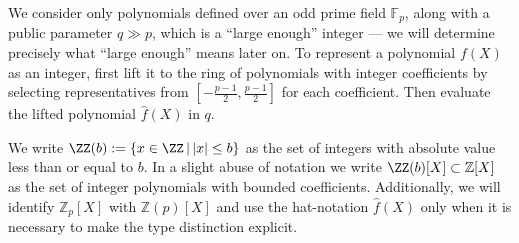 We consider only polynomials defined over an odd prime field $\mathbb{F}_p$, along with a public parameter $q \gg p$, which is a ``large enough'' integer --- we will determine precisely what ``large enough'' means later on. To represent a polynomial $f(X)$ as an integer, first lift it to the ring of polynomials with integer coefficients by selecting representatives from $[-\frac{p-1}{2},  \frac{p-1}{2}]$ for each coefficient. Then evaluate the lifted polynomial $\hat{f}(X)$ in $q$.

We write $\ZZ(b):=\{x \in \ZZ \, | \, \vert x \vert  \leq b\}$ as the set of integers with absolute value less than or equal to $b$. In a slight abuse of notation we write $\ZZ(b)[X]\subset \mathbb{Z}[X]$ as the set of integer polynomials with bounded coefficients. Additionally, we will identify $\mathbb{Z}_p[X]$ with $\mathbb{Z}(p)[X]$ and use the hat-notation $\hat{f}(X)$ only when it is necessary to make the type distinction explicit.

